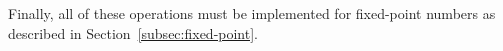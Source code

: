 








Finally, all of these operations must be implemented for fixed-point numbers as described in Section~\ref{subsec:fixed-point}.
